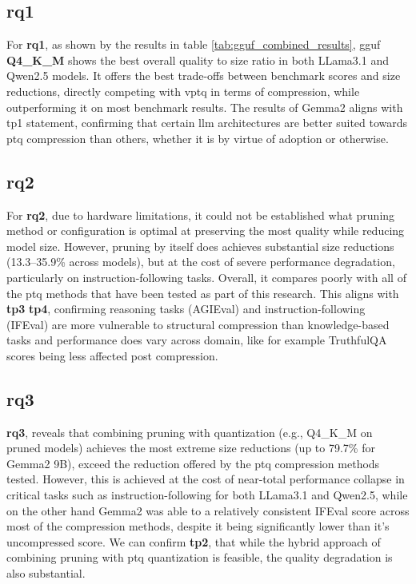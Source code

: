 \documentclass{ifacconf}
\begin{document}
    \subsection{\gls{rq}1}
    For \textbf{\gls{rq}1}, as shown by the results in table \ref{tab:gguf_combined_results}, \gls{gguf} \textbf{Q4\_K\_M} shows the best overall quality to size ratio in both LLama3.1 and Qwen2.5 models. It offers the best trade-offs between benchmark scores and size reductions, directly competing with \gls{vptq} in terms of compression, while outperforming it on most benchmark results. The results of Gemma2 aligns with \gls{tp}1 statement, confirming that certain \gls{llm} architectures are better suited towards \gls{ptq} compression than others, whether it is by virtue of adoption or otherwise. 

    \subsection{\gls{rq}2}
    For \textbf{\gls{rq}2}, due to hardware limitations, it could not be established what pruning method or configuration is optimal at preserving the most quality while reducing model size. However, pruning by itself does achieves substantial size reductions (13.3--35.9\% across models), but at the cost of severe performance degradation, particularly on instruction-following tasks. Overall, it compares poorly with all of the \gls{ptq} methods that have been tested as part of this research. This aligns with \textbf{\gls{tp}3} \textbf{\gls{tp}4}, confirming reasoning tasks (AGIEval) and instruction-following (IFEval) are more vulnerable to structural compression than knowledge-based tasks and performance does vary across domain, like for example TruthfulQA scores being less affected post compression.

    \subsection{\gls{rq}3}
    \textbf{\gls{rq}3}, reveals that combining pruning with quantization (e.g., Q4\_K\_M on pruned models) achieves the most extreme size reductions (up to 79.7\% for Gemma2 9B), exceed the reduction offered by the \gls{ptq} compression methods tested. However, this is achieved at the cost of near-total performance collapse in critical tasks such as instruction-following for both LLama3.1 and Qwen2.5, while on the other hand Gemma2 was able to a relatively consistent IFEval score across most of the compression methods, despite it being significantly lower than it's uncompressed score. We can confirm \textbf{\gls{tp}2}, that while the hybrid approach of combining pruning with \gls{ptq} quantization is feasible, the quality degradation is also substantial. 
\end{document}
